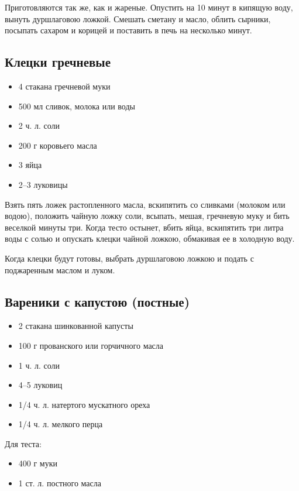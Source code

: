 Приготовляются так же, как и жареные. Опустить на 10 минут в кипящую воду, вынуть дуршлаговою ложкой. Смешать сметану и масло, облить сырники, посыпать сахаром и корицей и поставить в печь на несколько минут.

\subsection{Клецки гречневые}

\begin{itemize}
	\item 4 стакана гречневой муки 
    \item 500 мл сливок, молока или воды
    \item 2 ч. л. соли 
    \item 200 г коровьего масла 
    \item 3 яйца 
    \item 2–3 луковицы
\end{itemize}

Взять пять ложек растопленного масла, вскипятить со сливками (молоком или водою), положить чайную ложку соли, всыпать, мешая, гречневую муку и бить веселкой минуты три. Когда тесто остынет, вбить яйца, вскипятить три литра воды с солью и опускать клецки чайной ложкою, обмакивая ее в холодную воду.

Когда клецки будут готовы, выбрать дуршлаговою ложкою и подать с поджаренным маслом и луком.

\subsection{Вареники с капустою (постные)}

\begin{itemize}
	\item 2 стакана шинкованной капусты 
    \item 100 г прованского или горчичного масла 
    \item 1 ч. л. соли 
    \item 4–5 луковиц 
    \item 1/4 ч. л. натертого мускатного ореха 
    \item 1/4 ч. л. мелкого перца
\end{itemize}

Для теста: 

\begin{itemize}
	\item 400 г муки 
    \item 1 ст. л. постного масла
\end{itemize}

